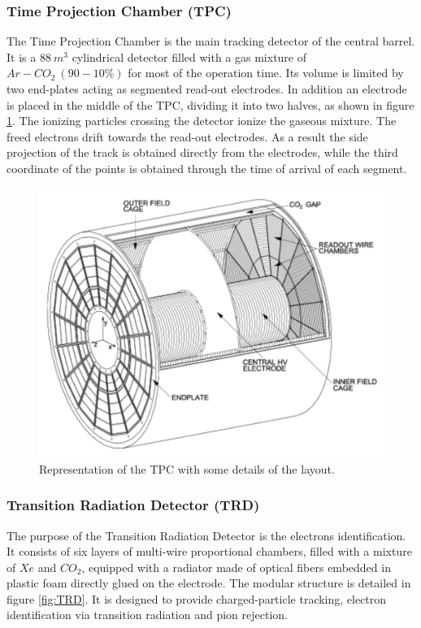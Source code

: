 \subsubsection{Time Projection Chamber (TPC)}
The Time Projection Chamber is the main tracking detector of the central barrel.
It is a $88\ m^3$ cylindrical detector filled with a gas mixture of $Ar-CO_2\ (90-10 \% )$ for most of the operation time.
Its volume is limited by two end-plates acting as segmented read-out electrodes. 
In addition an electrode is placed in the middle of the TPC, dividing it into two halves, as shown in figure \ref{fig:TPC}.
The ionizing particles crossing the detector ionize the gaseous mixture.
The freed electrons drift towards the read-out electrodes.
As a result the side projection of the track is obtained directly from the electrodes, while the third coordinate of the points is obtained through the time of arrival of each segment.

\begin{figure}[!h]
\begin{center}
\includegraphics[width=0.7\linewidth]{Chapters/Introduction/Figs/tpc.pdf}
\caption{Representation of the TPC with some details of the layout.}
\label{fig:TPC}
\end{center}
\end{figure}

\subsubsection{Transition Radiation Detector (TRD)}
The purpose of the Transition Radiation Detector is the electrons identification.
It consists of six layers of multi-wire proportional chambers, filled with a mixture of $Xe$ and $CO_2$, equipped with a radiator made of optical fibers embedded in plastic foam directly glued on the electrode.
The modular structure is detailed in figure \ref{fig:TRD}.
It is designed to provide charged-particle tracking, electron identification via transition radiation and pion rejection. 

